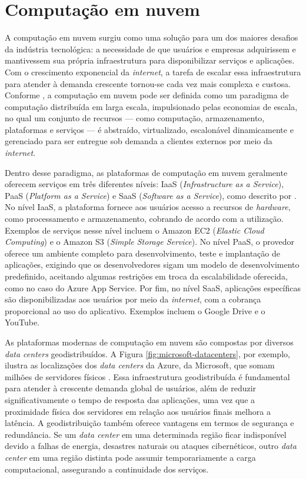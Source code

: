 \documentclass[
	12pt,				%
	oneside,			%
	a4paper,			%
	english,			%
	brazil				%
	]{abntex2ppgsi}
\begin{document}
\section{Computação em nuvem}\label{section:computacao-nuvem}

A computação em nuvem surgiu como uma solução para um dos maiores desafios da indústria tecnológica: a necessidade de que usuários e empresas adquirissem e mantivessem sua própria infraestrutura para disponibilizar serviços e aplicações. Com o crescimento exponencial da \textit{internet}, a tarefa de escalar essa infraestrutura para atender à demanda crescente tornou-se cada vez mais complexa e custosa. Conforme , a computação em nuvem pode ser definida como um paradigma de computação distribuída em larga escala, impulsionado pelas economias de escala, no qual um conjunto de recursos --- como computação, armazenamento, plataformas e serviços --- é abstraído, virtualizado, escalonável dinamicamente e gerenciado para ser entregue sob demanda a clientes externos por meio da \textit{internet}.

Dentro desse paradigma, as plataformas de computação em nuvem geralmente oferecem serviços em três diferentes níveis: IaaS (\textit{Infrastructure as a Service}), PaaS (\textit{Platform as a Service}) e SaaS (\textit{Software as a Service}), como descrito por . No nível IaaS, a plataforma fornece aos usuários acesso a recursos de \textit{hardware}, como processamento e armazenamento, cobrando de acordo com a utilização. Exemplos de serviços nesse nível incluem o Amazon EC2 (\textit{Elastic Cloud Computing}) e o Amazon S3 (\textit{Simple Storage Service}). No nível PaaS, o provedor oferece um ambiente completo para desenvolvimento, teste e implantação de aplicações, exigindo que os desenvolvedores sigam um modelo de desenvolvimento predefinido, aceitando algumas restrições em troca da escalabilidade oferecida, como no caso do Azure App Service. Por fim, no nível SaaS, aplicações específicas são disponibilizadas aos usuários por meio da \textit{internet}, com a cobrança proporcional ao uso do aplicativo. Exemplos incluem o Google Drive e o YouTube.

As plataformas modernas de computação em nuvem são compostas por diversos \textit{data centers} geodistribuídos. A Figura \ref{fig:microsoft-datacenters}, por exemplo, ilustra as localizações dos \textit{data centers} da Azure, da Microsoft, que somam milhões de servidores físicos . Essa infraestrutura geodistribuída é fundamental para atender à crescente demanda global de usuários, além de reduzir significativamente o tempo de resposta das aplicações, uma vez que a proximidade física dos servidores em relação aos usuários finais melhora a latência. A geodistribuição também oferece vantagens em termos de segurança e redundância. Se um \textit{data center} em uma determinada região ficar indisponível devido a falhas de energia, desastres naturais ou ataques cibernéticos, outro \textit{data center} em uma região distinta pode assumir temporariamente a carga computacional, assegurando a continuidade dos serviços.
\end{document}
